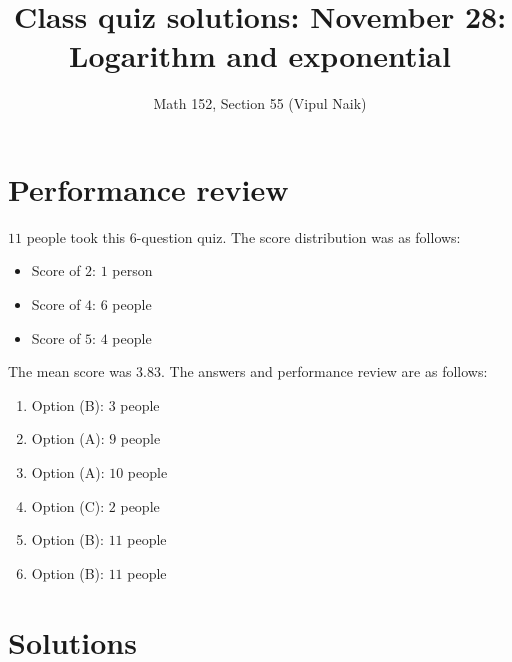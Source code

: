 \documentclass[10pt]{amsart}
\title{Class quiz solutions: November 28: Logarithm and exponential}
\author{Math 152, Section 55 (Vipul Naik)}
\begin{document}
\maketitle

\section{Performance review}

$11$ people took this $6$-question quiz. The score distribution was as
follows:

\begin{itemize}
\item Score of $2$: $1$ person
\item Score of $4$: $6$ people
\item Score of $5$: $4$ people
\end{itemize}

The mean score was $3.83$. The answers and performance review are as
follows:

\begin{enumerate}
\item Option (B): $3$ people
\item Option (A): $9$ people
\item Option (A): $10$ people
\item Option (C): $2$ people
\item Option (B): $11$ people
\item Option (B): $11$ people
\end{enumerate}

\section{Solutions}
\end{document}
